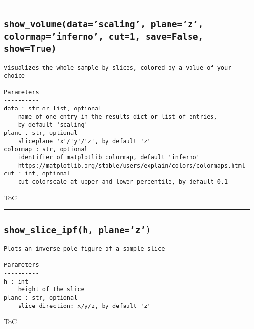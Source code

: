 \documentclass{article}
\begin{document}
\vspace{5mm}

\hrule

\subsection*{\texttt{show\_volume(data='scaling', plane='z', colormap='inferno', cut=1, save=False, show=True)}}

\begin{lstlisting}[language=docstring]
Visualizes the whole sample by slices, colored by a value of your choice

Parameters
----------
data : str or list, optional
    name of one entry in the results dict or list of entries, 
    by default 'scaling'
plane : str, optional
    sliceplane 'x'/'y'/'z', by default 'z'
colormap : str, optional
    identifier of matplotlib colormap, default 'inferno'
    https://matplotlib.org/stable/users/explain/colors/colormaps.html
cut : int, optional
    cut colorscale at upper and lower percentile, by default 0.1
\end{lstlisting}

\begin{flushright}

\hyperref[toc]{ToC}

\end{flushright}



\vspace{5mm}

\hrule

\subsection*{\texttt{show\_slice\_ipf(h, plane='z')}}

\begin{lstlisting}[language=docstring]
Plots an inverse pole figure of a sample slice

Parameters
----------
h : int
    height of the slice
plane : str, optional
    slice direction: x/y/z, by default 'z'
\end{lstlisting}

\begin{flushright}

\hyperref[toc]{ToC}

\end{flushright}
\end{document}
